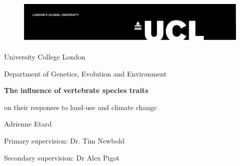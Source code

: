 \date{\today}

\begin{titlepage}

\begin{figure}
{\includegraphics[scale=0.8]{figures/UCL_logo}}
\end{figure}

\begin{center}

{\Large
University College London\par
Department of Genetics, Evolution and Environment\par
}
%
\vskip 6cm
%
{\huge \bf
The influence of vertebrate species traits  \par
on their responses to land-use and climate change\par
}
%
\vskip 4cm
%
{\Large
Adrienne Etard\par
\vskip 1cm
Primary supervision: Dr. Tim Newbold\par
Secondary supervision: Dr Alex Pigot

\vskip 2cm

\makeatletter
\@date
}
%
\vskip 3cm
%
{\large
 }
\vfil
\end{center}
\end{titlepage}

\makeatother